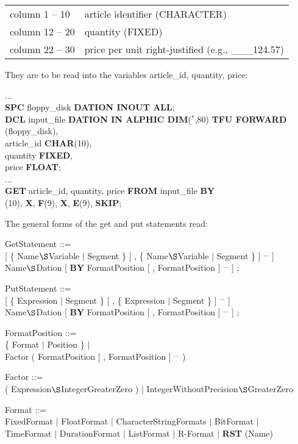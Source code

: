 \begin{enumerate}
\begin{tabular}{l@{:}l}
column  1 -- 10 & article identifier (CHARACTER)\\
column 12 -- 20 & quantity (FIXED)\\
column 22 -- 30 & price per unit right-justified (e.g., \_\_\_124.57)
\end{tabular}

They are to be read into the variables article\_id, quantity, price:

...\\
{\bf SPC} floppy\_disk {\bf DATION INOUT ALL};\\
{\bf DCL} input\_file {\bf DATION IN ALPHIC DIM}($^*$,80) {\bf TFU FORWARD}\\
\x {} (floppy\_disk),\\
\x article\_id {\bf CHAR}(10),\\
\x quantity {\bf FIXED},\\
\x price {\bf FLOAT};\\
...\\
{\bf GET} article\_id, quantity, price {\bf FROM} input\_file {\bf BY}\\
(10), {\bf X}, {\bf F}(9), {\bf X}, {\bf E}(9), {\bf SKIP};
\end{enumerate}

The general forms of the get and put statements read:

GetStatement ::=\\
 [ \{ Name$\S $Variable $\mid$ Segment \} [ , \{ Name$\S $Variable $\mid$ Segment \} ] $^{...}$ ]\\
 Name$\S $Dation [ {\bf BY} FormatPosition [ , FormatPosition ] $^{...}$ ] ;

PutStatement ::=\\
 [ \{ Expression $\mid$ Segment \} [ , \{ Expression $\mid$ Segment \} ] $^{...}$ ]\\
 Name$\S $Dation [ {\bf BY} FormatPosition [ , FormatPosition ] $^{...}$ ] ;

FormatPosition ::=\\
\x [ Factor ] \{ Format $\mid$ Position \} $\mid$\\
\x Factor ( FormatPosition [ , FormatPosition ] $^{...}$ )

Factor ::=\\
\x ( Expression$\S $IntegerGreaterZero ) $\mid$ IntegerWithoutPrecision$\S $GreaterZero

Format ::=\\
\x FixedFormat $\mid$ FloatFormat $\mid$ CharacterStringFormats $\mid$ BitFormat $\mid$\\
\x TimeFormat $\mid$ DurationFormat $\mid$ ListFormat $\mid$ R-Format $\mid$ {\bf RST} (Name)

